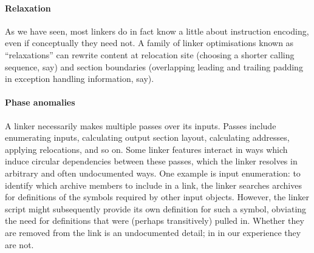 \paragraph{Relaxation}
As we have seen, most linkers do in fact
know a little about instruction encoding, even if conceptually they need not.
A family of linker optimisations known as ``relaxations'' 
can rewrite content at relocation site (choosing a shorter calling sequence, say) 
and section boundaries (overlapping leading and trailing padding in exception
handling information, say).

\paragraph{Phase anomalies} 
A linker necessarily makes multiple passes over its inputs.
Passes include enumerating inputs, calculating output section layout, 
calculating addresses, applying relocations, and so on.
Some linker features interact in ways which induce circular dependencies between
these passes, which the linker resolves in arbitrary and often undocumented ways.
One example is input enumeration: to identify which archive members
to include in a link, the linker searches archives for definitions
of the symbols required by other input objects.
However, the linker script might subsequently provide its own definition
for such a symbol, obviating the need for definitions that were (perhaps transitively) pulled in.
Whether they are removed from the link is an undocumented detail; 
in in our experience they are not.

